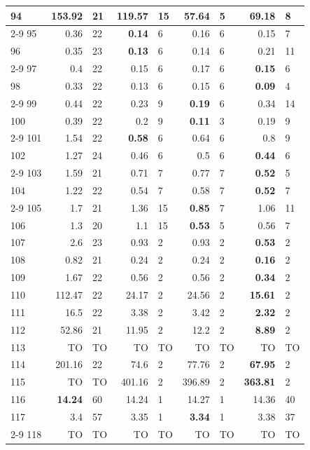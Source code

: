 \begin{longtable}{lr@{\hskip 4pt}l@{\hskip 12pt}r@{\hskip 4pt}l@{\hskip 12pt}r@{\hskip 4pt}l@{\hskip 12pt}r@{\hskip 4pt}l@{\hskip 12pt}}
94 & 153.92 & 21 & 119.57 & 15 & \textbf{57.64} & 5 & 69.18 & 8 \\
\cmidrule{2-9}
95 & 0.36 & 22 & \textbf{0.14} & 6 & 0.16 & 6 & 0.15 & 7 \\
96 & 0.35 & 23 & \textbf{0.13} & 6 & 0.14 & 6 & 0.21 & 11 \\
\cmidrule{2-9}
97 & 0.4 & 22 & 0.15 & 6 & 0.17 & 6 & \textbf{0.15} & 6 \\
98 & 0.33 & 22 & 0.13 & 6 & 0.15 & 6 & \textbf{0.09} & 4 \\
\cmidrule{2-9}
99 & 0.44 & 22 & 0.23 & 9 & \textbf{0.19} & 6 & 0.34 & 14 \\
100 & 0.39 & 22 & 0.2 & 9 & \textbf{0.11} & 3 & 0.19 & 9 \\
\cmidrule{2-9}
101 & 1.54 & 22 & \textbf{0.58} & 6 & 0.64 & 6 & 0.8 & 9 \\
102 & 1.27 & 24 & 0.46 & 6 & 0.5 & 6 & \textbf{0.44} & 6 \\
\cmidrule{2-9}
103 & 1.59 & 21 & 0.71 & 7 & 0.77 & 7 & \textbf{0.52} & 5 \\
104 & 1.22 & 22 & 0.54 & 7 & 0.58 & 7 & \textbf{0.52} & 7 \\
\cmidrule{2-9}
105 & 1.7 & 21 & 1.36 & 15 & \textbf{0.85} & 7 & 1.06 & 11 \\
106 & 1.3 & 20 & 1.1 & 15 & \textbf{0.53} & 5 & 0.56 & 7 \\
\midrule
107 & 2.6 & 23 & 0.93 & 2 & 0.93 & 2 & \textbf{0.53} & 2 \\
108 & 0.82 & 21 & 0.24 & 2 & 0.24 & 2 & \textbf{0.16} & 2 \\
109 & 1.67 & 22 & 0.56 & 2 & 0.56 & 2 & \textbf{0.34} & 2 \\
110 & 112.47 & 22 & 24.17 & 2 & 24.56 & 2 & \textbf{15.61} & 2 \\
111 & 16.5 & 22 & 3.38 & 2 & 3.42 & 2 & \textbf{2.32} & 2 \\
112 & 52.86 & 21 & 11.95 & 2 & 12.2 & 2 & \textbf{8.89} & 2 \\
113 & TO & TO & TO & TO & TO & TO & TO & TO \\
114 & 201.16 & 22 & 74.6 & 2 & 77.76 & 2 & \textbf{67.95} & 2 \\
115 & TO & TO & 401.16 & 2 & 396.89 & 2 & \textbf{363.81} & 2 \\
116 & \textbf{14.24} & 60 & 14.24 & 1 & 14.27 & 1 & 14.36 & 40 \\
117 & 3.4 & 57 & 3.35 & 1 & \textbf{3.34} & 1 & 3.38 & 37 \\
\cmidrule{2-9}
118 & TO & TO & TO & TO & TO & TO & TO & TO \\

\end{longtable}
